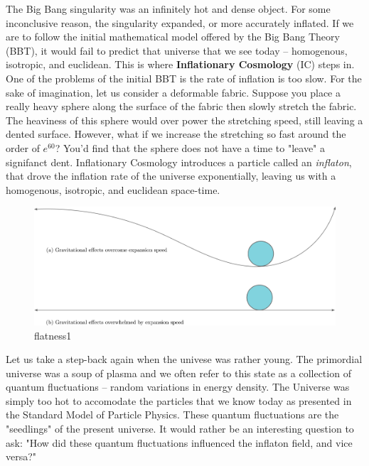 \documentclass[a4paper,11pt]{article}
\begin{document}
The Big Bang singularity was an infinitely hot and dense object. For some inconclusive reason,
the singularity expanded, or more accurately inflated. If we are to follow the initial mathematical model offered
by the Big Bang Theory (BBT), it would fail to predict that universe that we see today -- homogenous, isotropic, and euclidean.
This is where \textbf{Inflationary Cosmology} (IC) steps in. One of the problems of the initial BBT is the rate of inflation
is too slow. For the sake of imagination, let us consider a deformable fabric. Suppose you place a really heavy sphere along
the surface of the fabric then slowly stretch the fabric. The heaviness of this sphere would over power the stretching speed,
still leaving a dented surface. However, what if we increase the stretching so fast around the order of $e^{60}$? You'd find that
the sphere does not have a time to "leave" a signifanct dent. Inflationary Cosmology introduces a particle called an \textit{inflaton}, that drove the inflation rate of the universe 
exponentially, leaving us with a homogenous, isotropic, and euclidean space-time. 

\begin{figure}[htbp]
\centering
\def\imgwidth{0.75\linewidth}
\includegraphics[width=\imgwidth]{pasted-images/flatness1.png}
\caption{flatness1}
\label{fig:flatness1}
\end{figure}

Let us take a step-back again when the univese was rather young. The primordial universe was a soup of plasma and we often
refer to this state as a collection of quantum fluctuations -- random variations in energy density. The Universe was simply too hot
to accomodate the particles that we know today as presented in the Standard Model of Particle Physics. These quantum fluctuations are the "seedlings"
of the present universe. It would rather be an interesting question to ask: "How did these quantum fluctuations influenced the inflaton field, and vice versa?"
\end{document}
